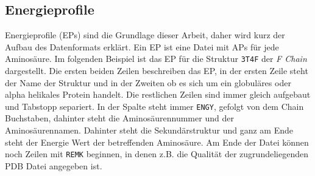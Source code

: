 \newpage
\subsection{Energieprofile}
\label{sec:Energieprofil}
Energieprofile (EPs) sind die Grundlage dieser Arbeit, daher wird kurz der Aufbau des Datenformats erklärt. Ein \ac{EP} ist eine Datei mit \ac{APs} für jede Aminosäure. Im folgenden Beispiel ist das \ac{EP} für die Struktur \texttt{3T4F} der \emph{F Chain} dargestellt. Die ersten beiden Zeilen beschreiben das \ac{EP}, in der ersten Zeile steht der Name der Struktur und in der Zweiten ob es sich um ein globuläres oder alpha helikales Protein handelt. Die restlichen Zeilen sind immer gleich aufgebaut und Tabstopp separiert. In der Spalte steht immer \texttt{ENGY}, gefolgt von dem Chain Buchstaben, dahinter steht die Aminosäurennummer und der Aminosäurennamen. Dahinter steht die Sekundärstruktur und ganz am Ende steht der Energie Wert der betreffenden Aminosäure. Am Ende der Datei können noch Zeilen mit \texttt{REMK} beginnen, in denen z.B. die Qualität der zugrundeliegenden \ac{PDB} Datei angegeben ist.

